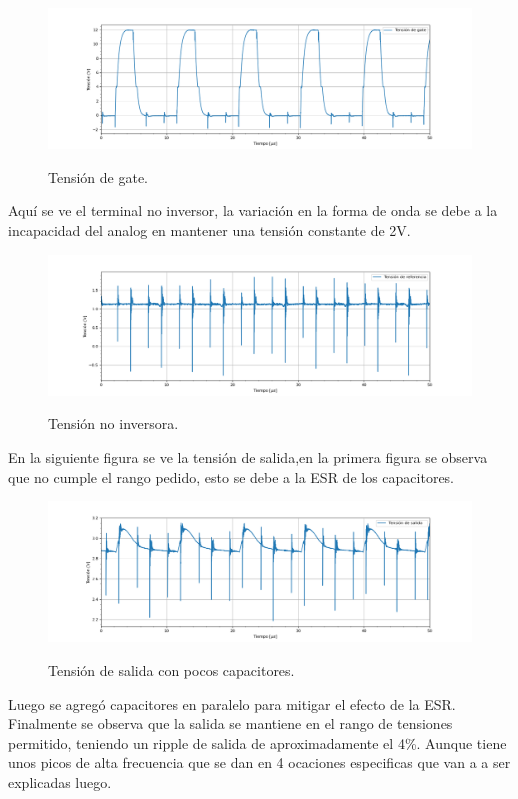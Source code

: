 \begin{figure}[H]
	\centering
	\includegraphics[width=0.9\linewidth]{ImagenesParteIV/Vgs.png}
	\label{fig:vgs_4}
	\caption{Tensión de gate.}
\end{figure}
Aquí se ve el terminal no inversor, la variación en la forma de onda se debe a la incapacidad del analog en mantener una tensión constante de 2V.
\begin{figure}[H]
	\centering	\includegraphics[width=0.9\linewidth]{ImagenesParteIV/Vref.png}
	\label{fig:vni_4}
	\caption{Tensión no inversora.}
\end{figure}

En la siguiente figura se ve  la tensión de salida,en la primera figura se observa que no cumple el rango pedido, esto se debe a la ESR de los capacitores.
\begin{figure}[H]
	\centering	\includegraphics[width=0.9\linewidth]{ImagenesParteIV/Vout_vieja.png}
	\label{fig:vout_4}
	\caption{Tensión de salida con pocos capacitores.}
\end{figure}

Luego se agregó capacitores en paralelo para mitigar el efecto de la ESR. Finalmente se observa que la salida se mantiene en el rango de tensiones permitido, teniendo un ripple de salida de aproximadamente el 4\%.  Aunque tiene unos picos de alta frecuencia que se dan en 4 ocaciones especificas que van a a ser explicadas luego.

